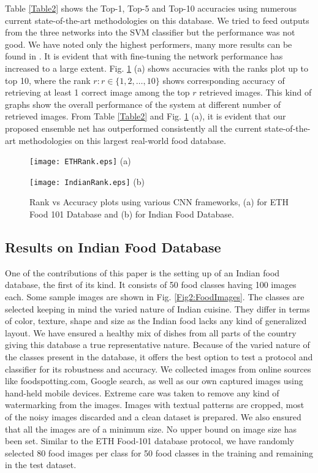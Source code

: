 \documentclass[journal]{IEEEtran}%
\begin{document}
Table \ref{Table2} shows the Top-1, Top-5 and Top-10 accuracies using numerous current state-of-the-art methodologies on this database. We tried to feed outputs from the three networks into the SVM classifier but the performance was not good. We have noted only the highest performers, many more results can be found in \cite{Martinel1}. It is evident that with fine-tuning the network performance has increased to a large extent. Fig. \ref{Fig4:ETHAccuracy} (a) shows accuracies with the ranks plot up to top 10, where the rank $r:r \in \{1, 2, \ldots, 10\}$ shows corresponding accuracy of retrieving at least 1 correct image among the top $r$ retrieved images. This kind of graphs show the overall performance of the system at different number of retrieved images. From Table \ref{Table2} and Fig. \ref{Fig4:ETHAccuracy} (a), it is evident that our proposed ensemble net has outperformed consistently all the current state-of-the-art methodologies on this largest real-world food database.

\begin{figure}
\centering
\begin{minipage}[b]{4.3cm}
\texttt{[image: ETHRank.eps]}
\centering (a)
\end{minipage}
\begin{minipage}[b]{4.3cm}
\texttt{[image: IndianRank.eps]}
\centering (b)
\end{minipage}
\caption{Rank vs Accuracy plots using various CNN frameworks, (a) for ETH Food 101 Database and (b) for Indian Food Database.} \label{Fig4:ETHAccuracy}
\end{figure}


\subsection{Results on Indian Food Database}
One of the contributions of this paper is the setting up of an Indian food database, the first of its kind. It consists of 50 food classes having 100 images each. Some sample images are shown in Fig. \ref{Fig2:FoodImages}. The classes are selected keeping in mind the varied nature of Indian cuisine. They differ in terms of color, texture, shape and size as the Indian food lacks any kind of generalized layout. We have ensured a healthy mix of dishes from all parts of the country giving this database a true representative nature. Because of the varied nature of the classes present in the database, it offers the best option to test a protocol and classifier for its robustness and accuracy. We collected images from online sources like foodspotting.com, Google search, as well as our own captured images using hand-held mobile devices. Extreme care was taken to remove any kind of watermarking from the images. Images with textual patterns are cropped, most of the noisy images discarded and a clean dataset is prepared. We also ensured that all the images are of a minimum size. No upper bound on image size has been set. Similar to the ETH Food-101 database protocol, we have randomly selected 80 food images per class for 50 food classes in the training and remaining in the test dataset.
\end{document}
